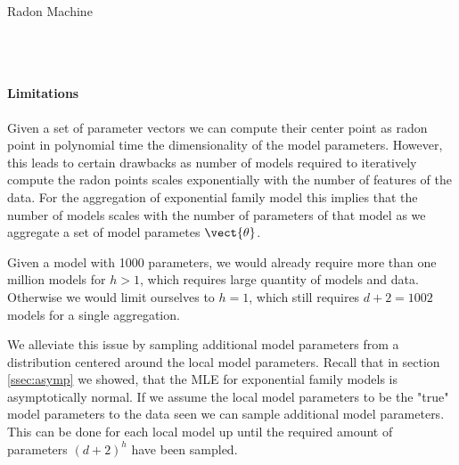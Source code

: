 \begin{algo}{Radon Machine}
\begin{algorithm}[H]
\begin{algorithmic}[1]
{            
            \ELSE
            \ENDIF
            \ENDFOR
            }\\
            \\
            \ENDFOR
        \end{algorithmic}
    \end{algorithm}
\end{algo}

\paragraph*{Limitations}
Given a set of parameter vectors we can compute their center point as radon point in polynomial time \wrt the dimensionality of the model parameters.
However, this leads to certain drawbacks as number of models required to iteratively compute the radon points scales exponentially with the number of features of the data.
For the aggregation of exponential family model this implies that the number of models scales with the number of parameters of that model as we aggregate a set of model parametes $\vect{\theta}$.

Given a model with 1000 parameters, we would already require more than one million models for $h > 1$, which requires large quantity of models and data.
Otherwise we would limit ourselves to $h=1$, which still requires $d+2 = 1002$ models for a single aggregation.

We alleviate this issue by sampling additional model parameters from a distribution centered around the local model parameters. 
Recall that in section \ref{ssec:asymp} we showed, that the MLE for exponential family 
models is asymptotically normal.
If we assume the local model parameters to be the "true" model parameters \wrt to the data seen we can sample additional model parameters. 
This can be done for each local model up until the required amount of parameters $(d+2)^h$ have been sampled.


